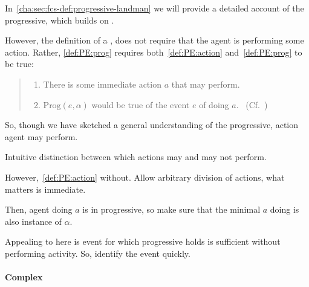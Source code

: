 \begin{note}[Action]
  In~\autoref{cha:sec:fcs-def:progressive-landman} we will provide a detailed account of the progressive, which builds on \textcite{Landman:1992wh}.

  However, the definition of a \pevent{}, does not require that the agent is performing some action.
  Rather, \ref{def:PE:prog} requires both~\ref{def:PE:action} and~\ref{def:PE:prog} to be true:
  \begin{quote}
    \begin{enumerate}[label=\alph*., ref=(\alph*)]
      \item
        There is some immediate action \(a\) that \vAgent{} may perform.
      \item
        \(\text{Prog}(e, \alpha)\) would be true of the event \(e\) of \vAgent{} doing \(a\).\newline
    \mbox{ }\hfill\mbox{(Cf.~)}
  \end{enumerate}
  \vspace{-\baselineskip}
  \end{quote}

  So, though we have sketched a general understanding of the progressive, action agent may perform.

  Intuitive distinction between which actions may and may not perform.

  However,~\ref{def:PE:action} without.
  Allow arbitrary division of actions, what matters is immediate.

  Then, agent doing \(a\) is in progressive, so make sure that the minimal \(a\) doing is also instance of \(\alpha\).

  Appealing to here is event for which progressive holds is sufficient without performing activity.
  So, identify the event quickly.
\end{note}

\paragraph{Complex}

